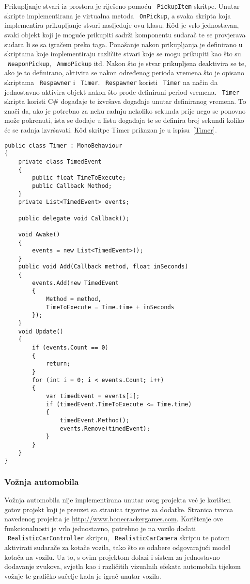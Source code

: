 Prikupljanje stvari iz prostora je riješeno pomoću ~\texttt{PickupItem} skritpe. Unutar
skripte implementirana je virtualna metoda ~\texttt{OnPickup}, a svaka skripta koja
implementira prikupljanje stvari nasljeđuje ovu klasu. K\^od je vrlo jednostavan,
svaki objekt koji je moguće prikupiti sadrži komponentu sudarač te se provjerava
sudara li se sa igračem preko taga. Ponašanje nakon prikupljanja je definirano u
skriptama koje implementiraju različite stvari koje se mogu prikupiti kao što su
~\texttt{WeaponPickup}, ~\texttt{AmmoPickup} itd. Nakon što je stvar prikupljena deaktivira se te, ako
je to definirano, aktivira se nakon određenog perioda vremena što je opisano
skriptama ~\texttt{Respawner} i ~\texttt{Timer}. ~\texttt{Respawner} koristi ~\texttt{Timer} na način da jednostavno
aktivira objekt nakon što prođe definirani period vremena. ~\texttt{Timer} skripta koristi C\#
događaje te izvršava događaje unutar definiranog vremena. To znači da, ako je
potrebno za neku radnju nekoliko sekunda prije nego se ponovno može pokrenuti, ista
se dodaje u listu događaja te se definira broj sekundi koliko će se radnja
izvršavati. K\^od skritpe Timer prikazan je u ispisu~\ref{Timer}.
\begin{lstlisting}[caption={Odbrojavač}, label=Timer]
public class Timer : MonoBehaviour
{
    private class TimedEvent
    {
        public float TimeToExecute;
        public Callback Method;
    }
    private List<TimedEvent> events;

    public delegate void Callback();

    void Awake()
    {
        events = new List<TimedEvent>();
    }
    public void Add(Callback method, float inSeconds)
    {
        events.Add(new TimedEvent
        {
            Method = method,
            TimeToExecute = Time.time + inSeconds
        });
    }
    void Update()
    {
        if (events.Count == 0)
        {
            return;
        }
        for (int i = 0; i < events.Count; i++)
        {
            var timedEvent = events[i];
            if (timedEvent.TimeToExecute <= Time.time)
            {
                timedEvent.Method();
                events.Remove(timedEvent);
            }
        }
    }
}
\end{lstlisting}
 \subsubsection*{Vožnja automobila}
Vožnja automobila nije implementirana unutar ovog projekta već je korišten gotov
projekt koji je preuzet sa stranica trgovine za dodatke. Stranica tvorca navedenog
projekta je \url{http://www.bonecrackergames.com}. Korištenje ove funkcionalnosti je
vrlo jednostavno, potrebno je na vozilo dodati ~\texttt{RealisticCarController} skriptu,
~\texttt{RealisticCarCamera} skriptu te potom aktivirati sudarače za kotače vozila, tako što
se odabere odgovarajući model kotača na vozilu. Uz to, s ovim projektom dolazi i
sistem za jednostavno dodavanje zvukova, svjetla kao i različitih vizualnih efekata
automobila tijekom vožnje te grafičko sučelje kada je igrač unutar vozila.

